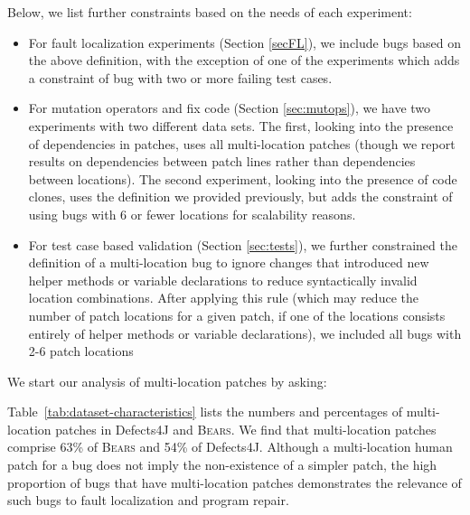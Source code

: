\documentclass[10pt,journal,compsoc]{IEEEtran}
\newcommand\bears{\textsc{Bears}\xspace}
\begin{document}
Below, we list further constraints based on the needs of each experiment:

\begin{itemize}
  \item For fault localization experiments (Section \ref{secFL}), we include bugs based on the above definition, 
  with the exception of one of the experiments which adds a constraint of bug with two or more failing test cases.
  \item For mutation operators and fix code (Section \ref{sec:mutops}), we have two experiments with two different data sets. 
  The first, looking into the presence of dependencies in patches, uses all multi-location patches 
  (though we report results on dependencies between patch lines rather than dependencies between locations). 
  The second experiment, looking into the presence of code clones, uses the definition we provided previously, 
  but adds the constraint of using bugs with 6 or fewer locations for scalability reasons.
  \item For test case based validation (Section \ref{sec:tests}), we further constrained the definition of a 
  multi-location bug to ignore changes that introduced new helper methods or variable declarations to reduce 
  syntactically invalid location combinations.
  After applying this rule (which may reduce the number of patch locations for a given patch, 
  if one of the locations consists entirely of helper methods or variable declarations), we included all bugs with 2-6 patch locations
\end{itemize}


We start our analysis of multi-location patches by asking:


Table~\ref{tab:dataset-characteristics} lists the numbers and percentages of
multi-location patches in Defects4J and \bears. 
We find that multi-location patches comprise 63\% of \bears and 54\% of 
Defects4J.
Although a multi-location human patch for a bug does not imply the 
non-existence of a simpler patch, the high proportion of bugs that have 
multi-location patches demonstrates the relevance of such bugs to fault localization and
program repair. 
\end{document}
